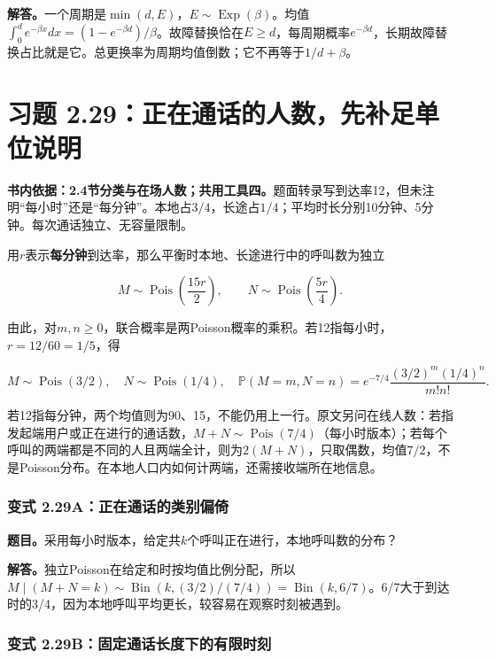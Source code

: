 \documentclass[12pt,a4paper,UTF8,fontset=fandol]{ctexart}
\begin{document}
\textbf{解答。}一个周期是\(\min(d,E)\)，\(E\sim\operatorname{Exp}(\beta)\)。均值\(\int_0^d e^{-\beta x}dx=(1-e^{-\beta d})/\beta\)。故障替换恰在\(E\ge d\)，每周期概率\(e^{-\beta d}\)，长期故障替换占比就是它。总更换率为周期均值倒数；它不再等于\(1/d+\beta\)。

\section{习题
2.29：正在通话的人数，先补足单位说明}\label{ux4e60ux9898-2.29ux6b63ux5728ux901aux8bddux7684ux4ebaux6570ux5148ux8865ux8db3ux5355ux4f4dux8bf4ux660e}

\textbf{书内依据：2.4节分类与在场人数；共用工具四。}题面转录写到达率12，但未注明``每小时''还是``每分钟''。本地占\(3/4\)，长途占\(1/4\)；平均时长分别10分钟、5分钟。每次通话独立、无容量限制。

用\(r\)表示\textbf{每分钟}到达率，那么平衡时本地、长途进行中的呼叫数为独立

\[\boxed{M\sim\operatorname{Pois}\left(\frac{15r}{2}\right),\qquad
N\sim\operatorname{Pois}\left(\frac{5r}{4}\right).}\]

由此，对\(m,n\ge0\)，联合概率是两Poisson概率的乘积。若12指每小时，\(r=12/60=1/5\)，得

\[\boxed{M\sim\operatorname{Pois}(3/2),\quad N\sim\operatorname{Pois}(1/4),\quad
\mathbb P(M=m,N=n)=e^{-7/4}\frac{(3/2)^m(1/4)^n}{m!n!}.}\]

若12指每分钟，两个均值则为90、15，不能仍用上一行。原文另问在线人数：若指发起端用户或正在进行的通话数，\(M+N\sim\operatorname{Pois}(7/4)\)（每小时版本）；若每个呼叫的两端都是不同的人且两端全计，则为\(2(M+N)\)，只取偶数，均值\(7/2\)，不是Poisson分布。在本地人口内如何计两端，还需接收端所在地信息。

\subsubsection{变式
2.29A：正在通话的类别偏倚}\label{ux53d8ux5f0f-2.29aux6b63ux5728ux901aux8bddux7684ux7c7bux522bux504fux501a}

\textbf{题目。}采用每小时版本，给定共\(k\)个呼叫正在进行，本地呼叫数的分布？

\textbf{解答。}独立Poisson在给定和时按均值比例分配，所以\(M\mid(M+N=k)\sim\operatorname{Bin}(k,(3/2)/(7/4))=\operatorname{Bin}(k,6/7)\)。6/7大于到达时的3/4，因为本地呼叫平均更长，较容易在观察时刻被遇到。

\subsubsection{变式
2.29B：固定通话长度下的有限时刻}\label{ux53d8ux5f0f-2.29bux56faux5b9aux901aux8bddux957fux5ea6ux4e0bux7684ux6709ux9650ux65f6ux523b}
\end{document}
